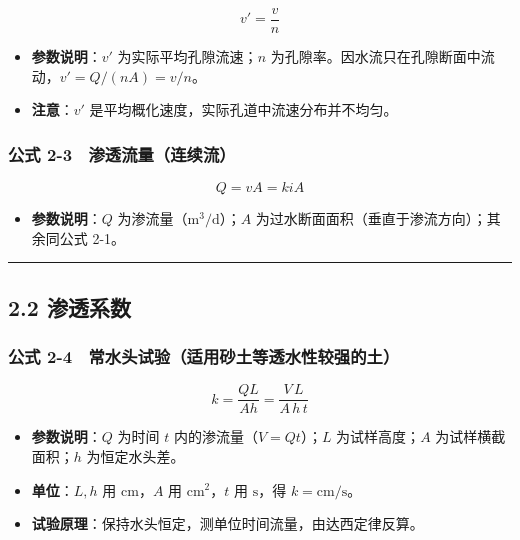 \documentclass[
]{article}
\providecommand{\tightlist}{%
  \setlength{\itemsep}{0pt}\setlength{\parskip}{0pt}}
\begin{document}
\[v'=\frac{v}{n}\]

\begin{itemize}
\tightlist
\item
  \textbf{参数说明}：\(v'\) 为实际平均孔隙流速；\(n\)
  为孔隙率。因水流只在孔隙断面中流动，\(v' = Q/(nA) = v/n\)。
\item
  \textbf{注意}：\(v'\) 是平均概化速度，实际孔道中流速分布并不均匀。
\end{itemize}

\subsubsection{公式
2-3　渗透流量（连续流）}\label{ux516cux5f0f-2-3-ux6e17ux900fux6d41ux91cfux8fdeux7eedux6d41}

\[Q=vA=kiA\]

\begin{itemize}
\tightlist
\item
  \textbf{参数说明}：\(Q\) 为渗流量（\(\mathrm{m^3/d}\)）；\(A\)
  为过水断面面积（垂直于渗流方向）；其余同公式 2-1。
\end{itemize}

\begin{center}\rule{0.5\linewidth}{0.5pt}\end{center}

\subsection{2.2 渗透系数}\label{ux6e17ux900fux7cfbux6570}

\subsubsection{公式
2-4　常水头试验（适用砂土等透水性较强的土）}\label{ux516cux5f0f-2-4-ux5e38ux6c34ux5934ux8bd5ux9a8cux9002ux7528ux7802ux571fux7b49ux900fux6c34ux6027ux8f83ux5f3aux7684ux571f}

\[k=\frac{QL}{Ah}=\frac{V\,L}{A\,h\,t}\]

\begin{itemize}
\tightlist
\item
  \textbf{参数说明}：\(Q\) 为时间 \(t\) 内的渗流量（\(V=Qt\)）；\(L\)
  为试样高度；\(A\) 为试样横截面积；\(h\) 为恒定水头差。
\item
  \textbf{单位}：\(L,h\) 用 \(\mathrm{cm}\)，\(A\) 用
  \(\mathrm{cm^2}\)，\(t\) 用 \(\mathrm{s}\)，得 \(k=\mathrm{cm/s}\)。
\item
  \textbf{试验原理}：保持水头恒定，测单位时间流量，由达西定律反算。
\end{itemize}
\end{document}
